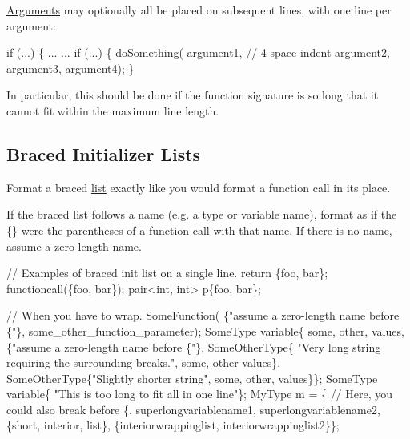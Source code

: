 \hyperlink{classArguments}{Arguments} may optionally all be placed on subsequent lines, with one line per argument\+:


\begin{DoxyCode}
\textcolor{keywordflow}{if} (...) \{
    ...
    ...
    \textcolor{keywordflow}{if} (...) \{
        doSomething(
            argument1,  \textcolor{comment}{// 4 space indent}
            argument2,
            argument3,
            argument4);
    \}
\end{DoxyCode}


In particular, this should be done if the function signature is so long that it cannot fit within the maximum line length.

\subsection*{Braced Initializer Lists}

Format a braced \hyperlink{protocollist-p}{list} exactly like you would format a function call in its place.

If the braced \hyperlink{protocollist-p}{list} follows a name (e.\+g. a type or variable name), format as if the {\ttfamily \{\}} were the parentheses of a function call with that name. If there is no name, assume a zero-\/length name.


\begin{DoxyCode}
\textcolor{comment}{// Examples of braced init list on a single line.}
\textcolor{keywordflow}{return} \{foo, bar\};
functioncall(\{foo, bar\});
pair<int, int> p\{foo, bar\};

\textcolor{comment}{// When you have to wrap.}
SomeFunction(
    \{\textcolor{stringliteral}{"assume a zero-length name before \{"}\},
    some\_other\_function\_parameter);
SomeType variable\{
    some, other, values,
    \{\textcolor{stringliteral}{"assume a zero-length name before \{"}\},
    SomeOtherType\{
        \textcolor{stringliteral}{"Very long string requiring the surrounding breaks."},
        some, other values\},
    SomeOtherType\{\textcolor{stringliteral}{"Slightly shorter string"},
                  some, other, values\}\};
SomeType variable\{
    \textcolor{stringliteral}{"This is too long to fit all in one line"}\};
MyType m = \{  \textcolor{comment}{// Here, you could also break before \{.}
    superlongvariablename1,
    superlongvariablename2,
    \{short, interior, list\},
    \{interiorwrappinglist,
     interiorwrappinglist2\}\};
\end{DoxyCode}


